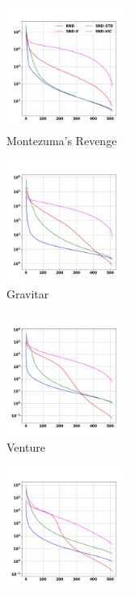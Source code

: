 \documentclass[a4paper,11pt]{elsarticle}
\begin{document}
\begin{figure}[t!]
  \centering
  \begin{subfigure}[b]{0.3\textwidth}
    \centering
    \includegraphics[width=4cm]{fig/analysis/anal_montezuma.png}
    \caption{Montezuma's Revenge}
    \label{fig:analysis2a}
  \end{subfigure}
  \begin{subfigure}[b]{0.3\textwidth}
    \centering
    \includegraphics[width=4cm]{fig/analysis/anal_gravitar.png}
    \caption{Gravitar}
    \label{fig:analysis2b}
  \end{subfigure}  
  \begin{subfigure}[b]{0.3\textwidth}
    \centering
    \includegraphics[width=4cm]{fig/analysis/anal_venture.png}
    \caption{Venture}
    \label{fig:analysis2c}
  \end{subfigure}
  \begin{subfigure}[b]{0.3\textwidth}
    \centering
    \includegraphics[width=4cm]{fig/analysis/anal_private_eye.png}

\end{subfigure}
\end{figure}
\end{document}
